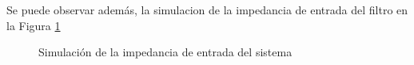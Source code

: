 Se puede observar adem\'as, la simulacion de la impedancia de entrada del filtro en la Figura \ref{fig:ZIN_SIST}
\begin{figure}[H]
    \centering
    \caption{Simulaci\'on de la impedancia de entrada del sistema}
    \label{fig:ZIN_SIST}
\end{figure}

